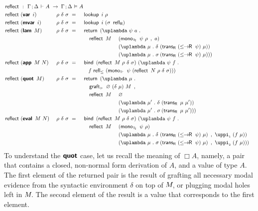 \documentclass[submission,copyright,creativecommons,sharealike,backref=page]{eptcs}
\newcommand{\sigmas}{\rlap{$\sigma$}\hphantom{\delta}}
\newcommand{\R}{\mathrel{\rlap{$\mkern.75mu\textsf{R}$}\hphantom{\subseteq}}}
\newcommand{\Rs}{\mathrel{\textsf{R}}}
\renewcommand{\:}{\mathop{\mkern3mu:\mkern3mu}}
\renewcommand{\.}{\mathop{\mkern3mu.\mkern3mu}}
\renewcommand{\;}{\mathop{;}}
\renewcommand{\,}{\mathop{,}}
\newcommand{\unit}{\varnothing}
\newcommand{\e}{\mathrel{\mkern2mu\vdash\mkern1mu}}
\newcommand{\ee}{\mathrel{\mkern2mu\Vdash\mkern1mu}}
\newcommand{\ees}{\mathrel{\mkern2mu\Vdash_{\mkern-9mu\scriptscriptstyle{\star}}}}
\newcommand{\ef}{\mathrel{\mkern2mu\vDash\mkern1mu}}
\renewcommand{\r}{\mathrel{\rightarrow\mkern-1mu}}
\newcommand{\reflect}{\operatorname{\textsf{reflect}}}
\newcommand{\monoee}{\operatorname{\textsf{mono}_{\ee}}}
\newcommand{\monoees}{\operatorname{\textsf{mono}_{\ees}}}
\newcommand{\pii}{\operatorname{\uppi_{\scriptscriptstyle{1}}}}
\newcommand{\piii}{\operatorname{\uppi_{\scriptscriptstyle{2}}}}
\newcommand{\reflle}{\operatorname{\textsf{refl}_{\le}}}
\newcommand{\reflR}{\operatorname{\textsf{refl}_{\Rs}}}
\newcommand{\transR}{\operatorname{\textsf{trans}_{\Rs}}}
\newcommand{\lerR}{\operatorname{\le\mkern-1mu\r\mkern-1mu\R}}
\newcommand{\var}{\operatorname{\textsf{\textbf{var}}}}
\newcommand{\mvar}{\operatorname{\textsf{\textbf{mvar}}}}
\newcommand{\lam}{\operatorname{\textsf{\textbf{lam}}}}
\newcommand{\app}{\operatorname{\textsf{\textbf{app}}}}
\newcommand{\quot}{\operatorname{\textsf{\textbf{quot}}}}
\newcommand{\eval}{\operatorname{\textsf{\textbf{eval}}}}
\newcommand{\return}{\operatorname{\textsf{return}}}
\newcommand{\bind}{\operatorname{\textsf{bind}}}
\newcommand{\lookup}{\operatorname{\textsf{lookup}}}
\newcommand{\grafte}{\operatorname{\textsf{graft}_{\e}}}
\theoremstyle{mystyle}
\begin{document}
\begin{alignat*}{5}
  & \reflect ~\:~ \rlap{$\Gamma \; \Delta \e A ~\r~ \Gamma \; \Delta \ef A$}\\
  & \reflect~(\var~i)    && ~\rho~\delta~\sigma ~=~ && \lookup~\rlap{$i~\rho$}\\
  & \reflect~(\mvar~i)   && ~\rho~\delta~\sigma ~=~ && \lookup~\rlap{$i~(\sigma~\reflR)$}\\
  & \reflect~(\lam~M)    && ~\rho~\delta~\sigma ~=~ && \return~\rlap{$(\uplambda~\psi~a \.$}\\
  &                      &&                         && \quad \reflect~M~ &&(\monoees~\psi~\rho~\,~a)\\
  &                      &&                         &&                   &&(\uplambda~\mu \. \delta~(\transR~(\lerR~\psi)~\mu))\\
  &                      &&                         &&                   &&(\uplambda~\mu \. \sigmas~(\transR~(\lerR~\psi)~\mu)))\\
  & \reflect~(\app~M~N)  && ~\rho~\delta~\sigma ~=~ && \bind~\rlap{$(\reflect~M~\rho~\delta~\sigma)~(\uplambda~\psi~f \.$}\\
  &                      &&                          && \quad f~\rlap{$\reflle~(\monoee~\psi~(\reflect~N~\rho~\delta~\sigma)))$}\\
  & \reflect~(\quot~M)   && ~\rho~\delta~\sigma ~=~ && \return~\rlap{$(\uplambda~\mu \.$}\\
  &                      &&                         && \quad \grafte~\rlap{$\unit~(\delta~\mu)~M~\,$}\\
  &                      &&                         && \quad \reflect~M~ &&\unit\\                                
  &                      &&                         &&                   &&(\uplambda~\mu' \. \delta~(\transR~\mu~\mu'))\\
  &                      &&                         &&                   &&(\uplambda~\mu' \. \sigmas~(\transR~\mu~\mu')))\\
  & \reflect~(\eval~M~N) && ~\rho~\delta~\sigma ~=~ && \bind~\rlap{$(\reflect~M~\rho~\delta~\sigma)~(\uplambda~\psi~f \.$}\\
  &                      &&                         && \quad \reflect~M~ &&(\monoees~\psi~\rho)\\
  &                      &&                         &&                   &&(\uplambda~\mu \. \delta~(\transR~(\lerR~\psi)~\mu)~\,~\pii~(f~\mu))\\
  &                      &&                         &&                   &&(\uplambda~\mu \. \sigmas~(\transR~(\lerR~\psi)~\mu)~\,~\piii~(f~\mu)))
\end{alignat*}
To understand the $\quot$ case, let us recall the meaning of $\Box A$, namely, a pair that contains a closed, non-normal form derivation of $A$, and a value of type $A$.  The first element of the returned pair is the result of grafting all necessary modal evidence from the syntactic environment $\delta$ on top of $M\mkern-3mu$, or plugging modal holes left in $M\mkern-3mu$.  The second element of the result is a value that corresponds to the first element. 
\end{document}
